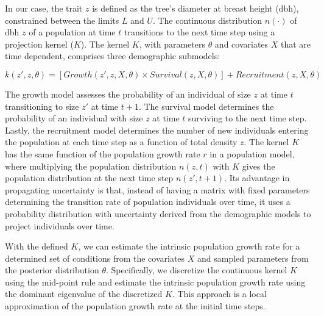 In our case, the trait \(z\) is defined as the tree's diameter at breast
height (dbh), constrained between the limits \(L\) and \(U\). The
continuous distribution \(n(\cdot)\) of dbh \(z\) of a population at
time \(t\) transitions to the next time step using a projection kernel
(\(K\)). The kernel \(K\), with parameters \(\theta\) and covariates
\(X\) that are time dependent, comprises three demographic submodels:

\begin{equation}
k(z', z, \theta) = [Growth(z', z, X, \theta) \times Survival(z, X, \theta)] + Recruitment(z, X, \theta)
\label{eq:kernel}\end{equation}

The growth model assesses the probability of an individual of size \(z\)
at time \(t\) transitioning to size \(z'\) at time \(t+1\). The survival
model determines the probability of an individual with size \(z\) at
time \(t\) surviving to the next time step. Lastly, the recruitment
model determines the number of new individuals entering the population
at each time step as a function of total density \(z\). The kernel \(K\)
has the same function of the population growth rate \(r\) in a
population model, where multiplying the population distribution
\(n(z, t)\) with \(K\) gives the population distribution at the next
time step \(n(z', t+1)\). Its advantage in propagating uncertainty is
that, instead of having a matrix with fixed parameters determining the
transition rate of population individuals over time, it uses a
probability distribution with uncertainty derived from the demographic
models to project individuals over time.

With the defined \(K\), we can estimate the intrinsic population growth
rate for a determined set of conditions from the covariates \(X\) and
sampled parameters from the posterior distribution \(\theta\).
Specifically, we discretize the continuous kernel \(K\) using the
mid-point rule \citep{Ellner2016} and estimate the intrinsic population
growth rate using the dominant eigenvalue of the discretized \(K\). This
approach is a local approximation of the population growth rate at the
initial time steps.

